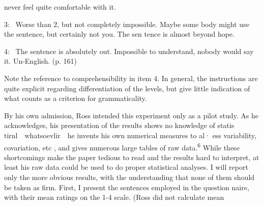 \begin{listWWNumileveli}
\item 
\begin{styleTextbody}
never feel quite comfortable with it.
\end{styleTextbody}


\end{listWWNumileveli}
\begin{styleTextbody}
3: \ Worse than 2, but not completely impossible. Maybe some\- body might use the sentence, but certainly not you. The sen\- tence is almost beyond hope.
\end{styleTextbody}


\begin{styleTextbody}
4: \ The sentence is absolutely out. Impossible to understand, nobody would say it. Un-English. (p. 161)
\end{styleTextbody}


\begin{styleTextbody}
Note the reference to comprehensibility in item 4. In general, the instructions are quite explicit regarding differentiation of the levels, but give little indication of what counts as a criterion for grammaticality.
\end{styleTextbody}


\begin{styleTextbody}
By his own admission, Ross intended this experiment only as a pilot study. As he acknowledges, his presentation of the results shows no knowledge of statis\- tirnl\ \ whatsoevli{\textquotesingle}r\ \ he invents his own numerical measures to al{\textquotesingle}· ess variability, covariation, etc , and gives numerous large tables of raw data.\textsuperscript{6}\textsuperscript{ }While these shortcomings make the paper tedious to read and the results hard to interpret, at least his raw data could be used to do proper statistical analyses. I will report only the more obvious results, with the understanding that none of them should be taken as firm. First, I present the sentences employed in the question\- naire, with their mean ratings on the 1-4 scale. (Ross did not calculate mean
\end{styleTextbody}


